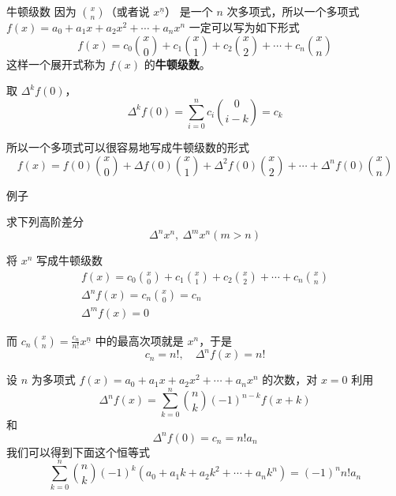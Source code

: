 \documentclass[UTF8]{beamer}
\begin{document}
    \begin{frame}{牛顿级数}
        因为 $\binom{x}{n}$（或者说 $x^{\underline n}$） 是一个 $n$ 次多项式，所以一个多项式 $f(x)=a_0+a_1x+a_2x^2+\cdots+a_nx^n$ 一定可以写为如下形式
        $$
        f(x)=c_0\binom{x}{0}+c_1\binom{x}{1}+c_2\binom{x}{2}+\cdots+c_n\binom{x}{n}
        $$
        这样一个展开式称为 $f(x)$ 的\textbf{牛顿级数}。

        \pause
        取 $\Delta^k f(0)$，
        $$
        \Delta^kf(0) = \sum_{i=0}^nc_i\binom{0}{i-k} = c_k
        $$

        所以一个多项式可以很容易地写成牛顿级数的形式
        $$
        f(x)=f(0)\binom{x}{0}+\Delta f(0)\binom{x}{1}+\Delta^2 f(0)\binom{x}{2}+\cdots+\Delta^n f(0)\binom{x}{n}
        $$
    \end{frame}

    \begin{frame}{例子}
        \begin{block}{求下列高阶差分}
            \vspace{-1em}
            $$
            \Delta^n x^n,\ \Delta^m x^n(m>n)
            $$
            \vspace{-1.5em}
        \end{block}
        将 $x^n$ 写成牛顿级数
        \begin{gather*}
        f(x)=c_0\binom{x}{0}+c_1\binom{x}{1}+c_2\binom{x}{2}+\cdots+c_n\binom{x}{n}\\
        \Delta^n f(x) = c_n\binom{x}{0} = c_n\\
        \Delta^m f(x) = 0
        \end{gather*}

        而 $c_n\binom{x}{n}=\frac{c_n}{n!}x^{\underline n}$ 中的最高次项就是 $x^n$，于是
        $$
        c_n=n!,\quad \Delta^n f(x) = n!
        $$
    \end{frame}

    \begin{frame}
        设 $n$ 为多项式 $f(x)=a_0+a_1x+a_2x^2+\cdots+a_nx^n$ 的次数，对 $x=0$ 利用 
        $$
        \Delta ^n f(x)=\sum_{k=0}^n\binom{n}{k}(-1)^{n-k}f(x+k)
        $$
        和
        $$
        \Delta^n f(0)=c_n = n! a_n
        $$
        我们可以得到下面这个恒等式
        $$
        \sum_{k=0}^n\binom{n}{k}(-1)^{k}(a_0+a_1k+a_2k^2+\cdots+a_nk^n)=(-1)^nn!a_n
        $$
    \end{frame}
\end{document}

